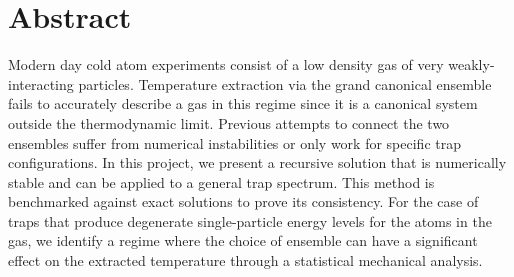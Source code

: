 \chapter*{Abstract}\label{ch:abstract}
Modern day cold atom experiments consist of a low density gas of very weakly-interacting particles. Temperature extraction via the grand canonical ensemble fails to accurately describe a gas in this regime since it is a canonical system outside the thermodynamic limit. Previous attempts  to connect the two ensembles suffer from numerical instabilities or only work for specific trap configurations. In this project, we present a recursive solution that is numerically stable and can be applied to a general trap spectrum. This method is benchmarked against exact solutions to prove its consistency. For the case of traps that produce degenerate single-particle energy levels for the atoms in the gas, we identify a regime where the choice of ensemble can have a significant effect on the extracted temperature through a statistical mechanical analysis.  